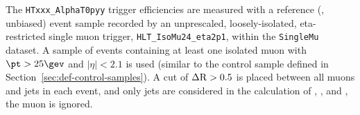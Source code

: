 %
The \verb!HTxxx_AlphaT0pyy! trigger efficiencies are measured with a
reference (\ie, unbiased) event sample recorded by an unprescaled,
loosely-isolated, eta-restricted single muon trigger,
\verb!HLT_IsoMu24_eta2p1!, within the \verb!SingleMu! dataset. A
sample of events containing at least one isolated muon with $\pt >
25\gev$ and $|\eta| < 2.1$ is used (similar to the \mj control sample
defined in Section~\ref{sec:def-control-samples}). A cut of $\Delta
{\rm R} > 0.5$ is placed between all muons and jets in each event, and
only jets are considered in the calculation of \scalht, \mht, and
\alphat, \ie the muon is ignored.
%
%

